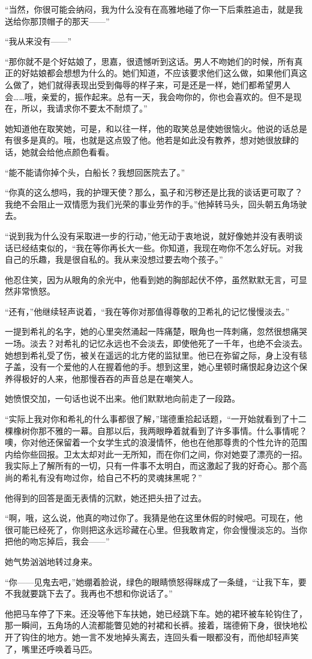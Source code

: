\par “当然，你很可能会纳闷，我为什么没有在高雅地碰了你一下后乘胜追击，就是我送给你那顶帽子的那天——”
\par “我从来没有——”
\par “那你就不是个好姑娘了，思嘉，很遗憾听到这话。男人不吻她们的时候，所有真正的好姑娘都会想想为什么的。她们知道，不应该要求他们这么做，如果他们真这么做了，她们就得表现出受到侮辱的样子来，可是还是一样，她们都希望男人会……哦，亲爱的，振作起来。总有一天，我会吻你的，你也会喜欢的。但不是现在，所以，我请求你不要太不耐烦了。”
\par 她知道他在取笑她，可是，和以往一样，他的取笑总是使她很恼火。他说的话总是有很多是真的。哦，也就是这点毁了他。他若是如此没有教养，想对她很放肆的话，她就会给他点颜色看看。
\par “能不能请你掉个头，白船长？我想回医院去了。”
\par “你真的这么想吗，我的护理天使？那么，虱子和污秽还是比我的谈话更可取了？我绝不会阻止一双情愿为我们光荣的事业劳作的手。”他掉转马头，回头朝五角场驶去。
\par “说到我为什么没有采取进一步的行动，”他无动于衷地说，就好像她并没有表明谈话已经结束似的，“我在等你再长大一些。你知道，我现在吻你不怎么好玩。对我自己的乐趣，我是很自私的。我从来没想过要去吻个孩子。”
\par 他忍住笑，因为从眼角的余光中，他看到她的胸部起伏不停，虽然默默无言，可显然非常愤怒。
\par “还有，”他继续轻声说着，“我在等你对那值得尊敬的卫希礼的记忆慢慢淡去。”
\par 一提到希礼的名字，她的心里突然涌起一阵痛楚，眼角也一阵刺痛，忽然很想痛哭一场。淡去？对希礼的记忆永远也不会淡去，即使他死了一千年，也绝不会淡去。她想到希礼受了伤，被关在遥远的北方佬的监狱里。他已在弥留之际，身上没有毯子盖，没有一个爱他的人在握着他的手。想到这里，她心里顿时痛恨起身边这个保养得极好的人来，他那慢吞吞的声音总是在嘲笑人。
\par 她愤恨交加，一句话也说不出来。他们默默地向前走了一段路。
\par “实际上我对你和希礼的什么事都很了解，”瑞德重拾起话题，“一开始就看到了十二棵橡树你那不雅的一幕。自那以后，我两眼睁着就看到了许多事情。什么事情呢？噢，你对他还保留着一个女学生式的浪漫情怀，他也在他那尊贵的个性允许的范围内给你些回报。卫太太却对此一无所知，而在你们之间，你对她耍了漂亮的一招。我实际上了解所有的一切，只有一件事不太明白，而这激起了我的好奇心。那个高尚的希礼有没有吻过你，给自己不朽的灵魂抹黑呢？”
\par 他得到的回答是面无表情的沉默，她还把头扭了过去。
\par “啊，哦，这么说，他真的吻过你了。我猜是他在这里休假的时候吧。可现在，他很可能已经死了，你则把这永远珍藏在心里。但我敢肯定，你会慢慢淡忘的。当你把他的吻忘掉后，我会——”
\par 她气势汹汹地转过身来。
\par “你——见鬼去吧，”她绷着脸说，绿色的眼睛愤怒得眯成了一条缝，“让我下车，要不我就要跳下去了。我再也不想和你说话了。”
\par 他把马车停了下来。还没等他下车扶她，她已经跳下车。她的裙环被车轮钩住了，那一瞬间，五角场的人流都能瞥见她的衬裙和长裤。接着，瑞德俯下身，很快地松开了钩住的地方。她一言不发地掉头离去，连回头看一眼都没有，而他却轻声笑了，嘴里还呼唤着马匹。

